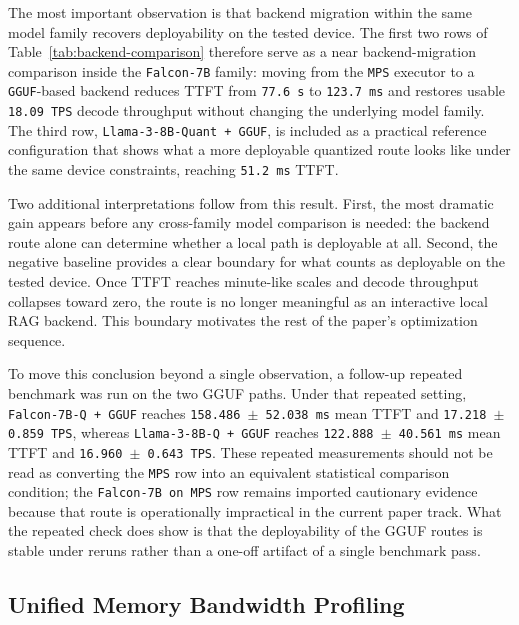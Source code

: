 \documentclass[10pt,twocolumn]{article}
\begin{document}


The most important observation is that backend migration within the same model family recovers deployability on the tested device. The first two rows of Table~\ref{tab:backend-comparison} therefore serve as a near backend-migration comparison inside the \texttt{Falcon-7B} family: moving from the \texttt{MPS} executor to a \texttt{GGUF}-based backend reduces TTFT from \texttt{77.6 s} to \texttt{123.7 ms} and restores usable \texttt{18.09 TPS} decode throughput without changing the underlying model family. The third row, \texttt{Llama-3-8B-Quant + GGUF}, is included as a practical reference configuration that shows what a more deployable quantized route looks like under the same device constraints, reaching \texttt{51.2 ms} TTFT.

Two additional interpretations follow from this result. First, the most dramatic gain appears before any cross-family model comparison is needed: the backend route alone can determine whether a local path is deployable at all. Second, the negative baseline provides a clear boundary for what counts as deployable on the tested device. Once TTFT reaches minute-like scales and decode throughput collapses toward zero, the route is no longer meaningful as an interactive local RAG backend. This boundary motivates the rest of the paper's optimization sequence.

To move this conclusion beyond a single observation, a follow-up repeated benchmark was run on the two GGUF paths. Under that repeated setting, \texttt{Falcon-7B-Q + GGUF} reaches \texttt{158.486 $\pm$ 52.038 ms} mean TTFT and \texttt{17.218 $\pm$ 0.859 TPS}, whereas \texttt{Llama-3-8B-Q + GGUF} reaches \texttt{122.888 $\pm$ 40.561 ms} mean TTFT and \texttt{16.960 $\pm$ 0.643 TPS}. These repeated measurements should not be read as converting the \texttt{MPS} row into an equivalent statistical comparison condition; the \texttt{Falcon-7B on MPS} row remains imported cautionary evidence because that route is operationally impractical in the current paper track. What the repeated check does show is that the deployability of the GGUF routes is stable under reruns rather than a one-off artifact of a single benchmark pass.

\subsection{Unified Memory Bandwidth Profiling}
\end{document}
